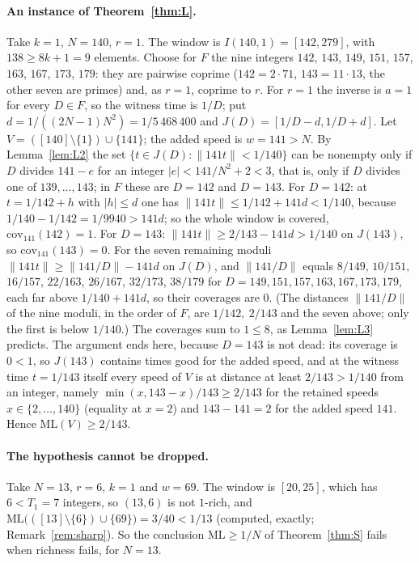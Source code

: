 \documentclass[11pt]{article}
\theoremstyle{definition}
\theoremstyle{remark}
\newcommand{\nd}[1]{\lVert #1\rVert}
\newcommand{\ML}{\mathrm{ML}}
\begin{document}
\paragraph{An instance of Theorem~\ref{thm:L}.}
Take $k=1$, $N=140$, $r=1$. The window is $I(140,1)=[142,279]$, with $138\ge8k+1=9$ elements. Choose for $F$ the nine integers $142$, $143$, $149$, $151$, $157$, $163$, $167$, $173$, $179$: they are pairwise coprime ($142=2\cdot71$, $143=11\cdot13$, the other seven are primes) and, as $r=1$, coprime to $r$. For $r=1$ the inverse is $a=1$ for every $D\in F$, so the witness time is $1/D$; put $d=1/((2N-1)N^2)=1/5\,468\,400$ and $J(D)=[1/D-d,1/D+d]$. Let $V=([140]\setminus\{1\})\cup\{141\}$; the added speed is $w=141>N$. By Lemma~\ref{lem:L2} the set $\{t\in J(D):\nd{141t}<1/140\}$ can be nonempty only if $D$ divides $141-e$ for an integer $|e|<141/N^2+2<3$, that is, only if $D$ divides one of $139,\dots,143$; in $F$ these are $D=142$ and $D=143$. For $D=142$: at $t=1/142+h$ with $|h|\le d$ one has $\nd{141t}\le1/142+141d<1/140$, because $1/140-1/142=1/9940>141d$; so the whole window is covered, $\mathrm{cov}_{141}(142)=1$. For $D=143$: $\nd{141t}\ge2/143-141d>1/140$ on $J(143)$, so $\mathrm{cov}_{141}(143)=0$. For the seven remaining moduli $\nd{141t}\ge\nd{141/D}-141d$ on $J(D)$, and $\nd{141/D}$ equals $8/149$, $10/151$, $16/157$, $22/163$, $26/167$, $32/173$, $38/179$ for $D=149,151,157,163,167,173,179$, each far above $1/140+141d$, so their coverages are $0$. (The distances $\nd{141/D}$ of the nine moduli, in the order of $F$, are $1/142,\ 2/143$ and the seven above; only the first is below $1/140$.) The coverages sum to $1\le8$, as Lemma~\ref{lem:L3} predicts. The argument ends here, because $D=143$ is not dead: its coverage is $0<1$, so $J(143)$ contains times good for the added speed, and at the witness time $t=1/143$ itself every speed of $V$ is at distance at least $2/143>1/140$ from an integer, namely $\min(x,143-x)/143\ge2/143$ for the retained speeds $x\in\{2,\dots,140\}$ (equality at $x=2$) and $143-141=2$ for the added speed $141$. Hence $\ML(V)\ge2/143$.

\paragraph{The hypothesis cannot be dropped.}
Take $N=13$, $r=6$, $k=1$ and $w=69$. The window is $[20,25]$, which has $6<T_1=7$ integers, so $(13,6)$ is not $1$-rich, and $\ML\bigl(([13]\setminus\{6\})\cup\{69\}\bigr)=3/40<1/13$ (computed, exactly; Remark~\ref{rem:sharp}). So the conclusion $\ML\ge1/N$ of Theorem~\ref{thm:S} fails when richness fails, for $N=13$.
\end{document}
